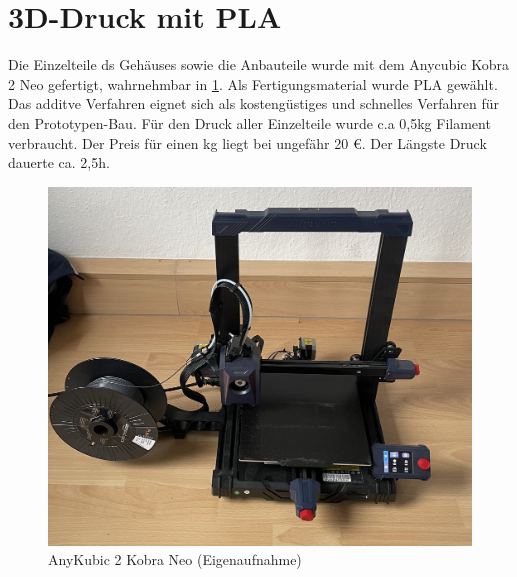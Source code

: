 \section{3D-Druck mit PLA}
Die Einzelteile ds Gehäuses sowie die Anbauteile wurde mit dem Anycubic Kobra 2 Neo gefertigt, wahrnehmbar in \ref{AKK2N}. Als Fertigungsmaterial wurde PLA gewählt. Das additve Verfahren eignet sich als kostengüstiges und schnelles Verfahren für den Prototypen-Bau. Für den Druck aller Einzelteile wurde c.a 0,5kg Filament verbraucht. Der Preis für einen kg liegt bei ungefähr 20 €. Der Längste Druck dauerte ca. 2,5h. 

 \begin{figure}[H]
 	\begin{center}
 		\includegraphics[width=\textwidth]{Images/Konstruktion/AKK2N.jpg}
 		\caption{AnyKubic 2 Kobra Neo (Eigenaufnahme)} \label{AKK2N}
 	\end{center}
 \end{figure}  
